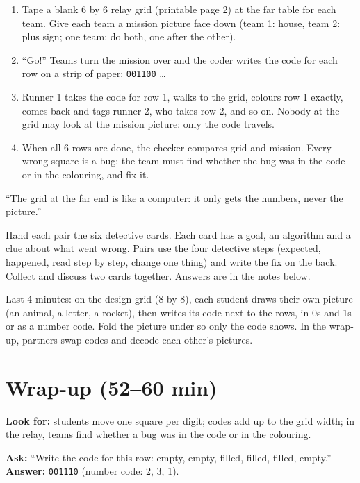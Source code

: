 \begin{unplugged}
\begin{enumerate}[leftmargin=1.4em,itemsep=1pt]
  \item Tape a blank 6 by 6 relay grid (printable page 2) at the far table for each team. Give each team a mission picture face down (team 1: house, team 2: plus sign; one team: do both, one after the other).
  \item \enquote{Go!} Teams turn the mission over and the coder writes the code for each row on a strip of paper: \texttt{001100} \ldots
  \item Runner 1 takes the code for row 1, walks to the grid, colours row 1 exactly, comes back and tags runner 2, who takes row 2, and so on. Nobody at the grid may look at the mission picture: only the code travels.
  \item When all 6 rows are done, the checker compares grid and mission. Every wrong square is a bug: the team must find whether the bug was in the code or in the colouring, and fix it.
\end{enumerate}
\enquote{The grid at the far end is like a computer: it only gets the numbers, never the picture.}
\end{unplugged}

\begin{bughunt}
Hand each pair the six detective cards. Each card has a goal, an algorithm and a clue about what went wrong. Pairs use the four detective steps (expected, happened, read step by step, change one thing) and write the fix on the back. Collect and discuss two cards together. Answers are in the notes below.
\end{bughunt}

\begin{freebuild}
Last 4 minutes: on the design grid (8 by 8), each student draws their own picture (an animal, a letter, a rocket), then writes its code next to the rows, in 0s and 1s or as a number code. Fold the picture under so only the code shows. In the wrap-up, partners swap codes and decode each other's pictures.
\end{freebuild}

\section{Wrap-up (52--60 min)}
\begin{formativecheck}
\textbf{Look for:} students move one square per digit; codes add up to the grid width; in the relay, teams find whether a bug was in the code or in the colouring.

\textbf{Ask:} \enquote{Write the code for this row: empty, empty, filled, filled, filled, empty.}
\textbf{Answer:} \texttt{001110} (number code: 2, 3, 1).
\end{formativecheck}

